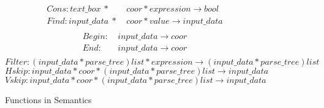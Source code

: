 \begin{figure}[ht!]
\tiny
\centering

\begin{align*}
  Cons:text\_box~*&~coor*expression \rightarrow bool \\
  Find:input\_data~*&~coor*value \rightarrow input\_data \\
\end{align*}
\begin{align*}
  Begin:&~input\_data \rightarrow coor \\
  End:&~input\_data \rightarrow coor \\
\end{align*}
\[
  Filter:(input\_data*parse\_tree)list*expression \rightarrow (input\_data*parse\_tree)list 
\]
\[
  Hskip:input\_data*coor*(input\_data*parse\_tree)list \rightarrow input\_data 
\]
\[
  Vskip:input\_data*coor*(input\_data*parse\_tree)list \rightarrow input\_data 
\]

\caption{Functions in Semantics}\label{fig:funseman}
\end{figure}

